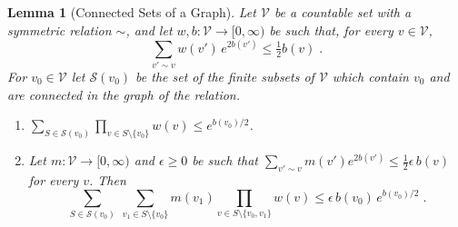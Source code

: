 \documentclass[11pt]{preprint}
\numberwithin{equation}{section}
\newtheorem{lemma}[theorem]{Lemma}
\theoremstyle{definition}
\theoremstyle{remark}
\theoremstyle{plain}
\begin{document}
\begin{lemma}[Connected Sets of a Graph]\label{lem:tree-bound}
Let $\mathcal V$ be a countable set with a symmetric relation $\sim$, and let $w, b\colon \mathcal V \to [0, \infty)$ be such that, for every $v \in \mathcal V$,
\begin{equation}\label{eq:tree-condition}
    \sum_{v' \sim v}w(v')\,e^{2b(v')} \leq \tfrac12b(v)\;.
\end{equation}
For $v_0 \in \mathcal V$ let $\mathcal S(v_0)$ be the set of the finite subsets of $\mathcal V$ which contain $v_0$ and are connected in the graph of the relation.
\begin{enumerate}[label=(\roman*)]
\item $\sum_{S \in \mathcal S(v_0)}\prod_{v \in S \setminus \{ v_0 \}}w(v) \leq e^{b(v_0)/2}$.
\item Let $m\colon \mathcal V \to [0, \infty)$ and $\epsilon \geq 0$ be such that $\sum_{v' \sim v}m(v')e^{2b(v')} \leq \frac12\epsilon\,b(v)$ for every $v$. Then
\[
    \sum_{S \in \mathcal S(v_0)}\ \sum_{v_1 \in S \setminus \{ v_0 \}}m(v_1)\prod_{v \in S \setminus \{ v_0, v_1 \}}w(v) \leq \epsilon\,b(v_0)\,e^{b(v_0)/2}\;.
\]
\end{enumerate}
\end{lemma}
\end{document}
